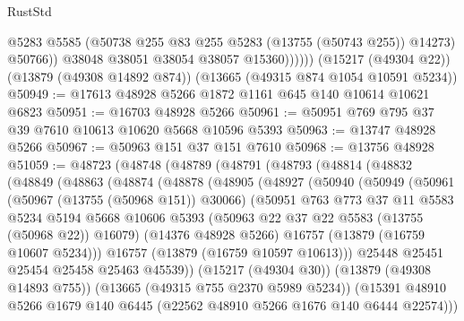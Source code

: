 \begin{lexlean}{RustStd}
\begin{coremodule}
                    @5283
                    @5585
                    (@50738 @255 @83 @255 @5283 (@13755 (@50743 @255)) @14273)
                    @50766))
                @38048
                @38051
                @38054
                @38057
                @15360))))))
    (@15217 (@49304 @22))
    (@13879 (@49308 @14892 @874))
    (@13665 (@49315 @874 @1054 @10591 @5234))
@50949 := @17613 @48928 @5266 @1872 @1161 @645 @140 @10614 @10621 @6823
@50951 := @16703 @48928 @5266
@50961 := @50951 @769 @795 @37 @39 @7610 @10613 @10620 @5668 @10596 @5393
@50963 := @13747 @48928 @5266
@50967 := @50963 @151 @37 @151 @7610
@50968 := @13756 @48928
@51059 := @48723
    (@48748
      (@48789
        (@48791
          (@48793
            (@48814
              (@48832
                (@48849
                  (@48863
                    (@48874
                      (@48878
                        (@48905
                          (@48927
                            (@50940
                              (@50949
                                (@50961
                                  (@50967 (@13755 (@50968 @151)) @30066)
                                  (@50951
                                    @763
                                    @773
                                    @37
                                    @11
                                    @5583
                                    @5234
                                    @5194
                                    @5668
                                    @10606
                                    @5393
                                    (@50963 @22 @37 @22 @5583 (@13755 (@50968 @22)) @16079)
                                    (@14376 @48928 @5266)
                                    @16757
                                    (@13879 (@16759 @10607 @5234)))
                                  @16757
                                  (@13879 (@16759 @10597 @10613)))
                                @25448
                                @25451
                                @25454
                                @25458
                                @25463
                                @45539))
                            (@15217 (@49304 @30))
                            (@13879 (@49308 @14893 @755))
                            (@13665 (@49315 @755 @2370 @5989 @5234))
                            (@15391
                              @48910
                              @5266
                              @1679
                              @140
                              @6445
                              (@22562 @48910 @5266 @1676 @140 @6444 @22574)))

\end{coremodule}
\end{lexlean}
